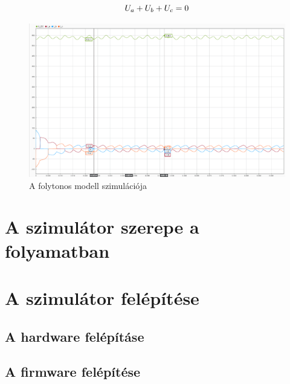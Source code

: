 \begin{equation}
    \centering
    U_a+U_b+U_c = 0
\end{equation}

\begin{figure}[H!]
	\centering
	\includegraphics[width = \textwidth]{figures/continous_testrun_1.png}
	\caption{A folytonos modell szimulációja} 
	\label{fig:cont_run}
\end{figure}




\section{A szimulátor szerepe a folyamatban}
\section{A szimulátor felépítése}
\subsection{A hardware felépításe}
\subsection{A firmware felépítése}